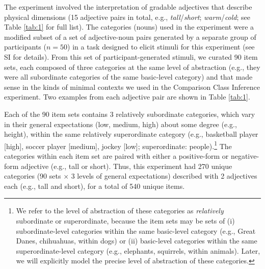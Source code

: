 \documentclass[doc, floatsintext]{apa6}
\begin{document}
The experiment involved the interpretation of gradable adjectives that describe physical dimensions (15 adjective pairs in total, e.g., \emph{tall}/\emph{short}; \emph{warm}/\emph{cold}; see Table \ref{tab:1} for full list).
The categories (nouns) used in the experiment were a modified subset of a set of adjective-noun pairs generated by a separate group of participants ($n=50$) in a task designed to elicit stimuli for this experiment (see SI for details).
From this set of participant-generated stimuli, we curated 90 item sets, each composed of three categories at the same level of abstraction  (e.g., they were all subordinate categories of the same basic-level category) and that made sense in the kinds of minimal contexts we used in the Comparison Class Inference experiment.
Two examples from each adjective pair are shown in Table \ref{tab:1}.

Each of the 90 item sets contains 3 relatively subordinate categories, which vary in their general expectations (low, medium, high) about some degree (e.g., height), within the same relatively superordinate category (e.g., basketball player [high], soccer player [medium], jockey [low]; superordinate: people).\footnote{
We refer to the level of abstraction of these categories as \emph{relatively} subordinate or superordinate, because the item sets may be sets of (i) subordinate-level categories within the same basic-level category (e.g., Great Danes, chihuahuas, within dogs) or (ii) basic-level categories within the same superordinate-level category (e.g., elephants, squirrels, within animals). Later, we will explicitly model the precise level of abstraction of these categories.
}
The categories within each item set are paired with either a positive-form or negative-form adjective (e.g., tall or short).
Thus, this experiment had 270 unique categories (90 sets $\times$ 3 levels of general expectations) described with 2 adjectives each (e.g., tall and short), for a total of 540 unique items.
\end{document}
